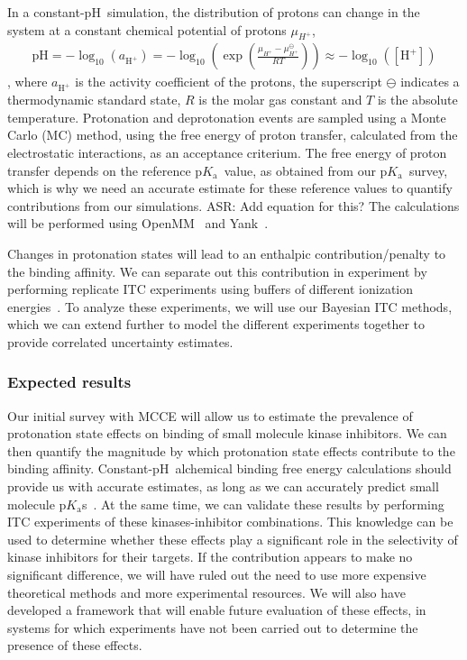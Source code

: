 \documentclass[10pt,final]{article}
\newcommand{\pKa}{p$K_\mathrm{a}$\ }
\newcommand{\pH}{p$\mathrm{H}$\ }
\newcommand{\pKas}{p$K_\mathrm{a}$s\ }
\begin{document}
%

In a constant-\pH simulation, the distribution of protons can change in the system at a constant chemical potential of protons $\mu_{H^+}$,
\begin{align}
 \text{p}\mathrm{H} = -\log_{10}\left( a_{\mathrm{H}^+} \right) = -\log_{10}\left( \exp\left(\frac{\mu_{H^+} -\mu_{H^+}^\ominus}{RT}\right)\right) \approx -\log_{10}\left( [\mathrm{H}^+] \right) 
\end{align}
, where $a_{\mathrm{H}^+}$ is the activity coefficient of the protons, the superscript $\ominus$ indicates a thermodynamic standard state, $R$ is the molar gas constant and $T$ is the absolute temperature.
%
Protonation and deprotonation events are sampled using a Monte Carlo (MC) method, using the free energy of proton transfer, calculated from the electrostatic interactions, as an acceptance criterium.
%
The free energy of proton transfer depends on the reference \pKa value, as obtained from our \pKa survey, which is why we need an accurate estimate for these reference values to quantify contributions from our simulations.
{\color{purple} ASR: Add equation for this?}
%
The calculations will be performed using OpenMM~\autocite{Eastman2013a} and Yank~\autocite{Chodera2015a}.
%

Changes in protonation states will lead to an enthalpic contribution/penalty to the binding affinity.
%
We can separate out this contribution in experiment by performing replicate ITC experiments using buffers of different ionization energies~\autocite{Baker1996a,Neeb2014a}.
%
To analyze these experiments, we will use our Bayesian ITC methods, which we can extend further to model the different experiments together to provide correlated uncertainty estimates.

\subsubsection*{Expected results}
Our initial survey with MCCE will allow us to estimate the prevalence of protonation state effects on binding of small molecule kinase inhibitors. 
%
We can then quantify the magnitude by which protonation state effects contribute to the binding affinity.
%
Constant-\pH alchemical binding free energy calculations should provide us with accurate estimates, as long as we can accurately predict small molecule \pKas. 
%
At the same time, we can validate these results by performing ITC experiments of these kinases-inhibitor combinations.
%
This knowledge can be used to determine whether these effects play a significant role in the selectivity of kinase inhibitors for their targets.
%
If the contribution appears to make no significant difference, we will have ruled out the need to use more expensive theoretical methods and more experimental resources.
%
We will also have developed a framework that will enable future evaluation of these effects, in systems for which experiments have not been carried out to determine the presence of these effects.
\end{document}
